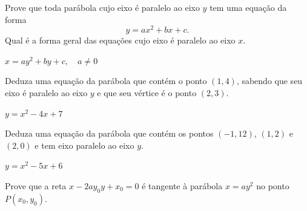 \documentclass[12pt]{exam}
\begin{document}
\begin{exercicio}
    Prove que toda parábola cujo eixo é paralelo ao eixo $y$ tem uma equação da forma
    \[
        y = ax^2 + bx + c.
    \]
    Qual é a forma geral das equações cujo eixo é paralelo ao eixo $x$.
    \begin{solucao}
        $x = ay^2 + by + c,\quad a \ne 0$
    \end{solucao}
\end{exercicio}

\begin{exercicio}
    Deduza uma equação da parábola que contém o ponto $(1,4)$, sabendo que seu eixo é paralelo ao eixo $y$ e que seu vértice é o ponto $(2,3)$.
    \begin{solucao}
        $y = x^2 - 4x + 7$
    \end{solucao}
\end{exercicio}

\begin{exercicio}
    Deduza uma equação da parábola que contém os pontos $(-1,12)$, $(1,2)$ e $(2,0)$ e tem eixo paralelo ao eixo $y$.
    \begin{solucao}
        $y = x^2 - 5x + 6$
    \end{solucao}
\end{exercicio}

\begin{exercicio}
    Prove que a reta $x - 2ay_0y + x_0 = 0$ é tangente à parábola $x = ay^2$ no ponto $P(x_0,y_0)$.
\end{exercicio}
\end{document}

